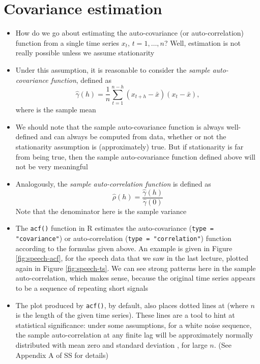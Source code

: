 \documentclass{article}
\begin{document}
\section{Covariance estimation}

\begin{itemize}
\item How do we go about estimating the auto-covariance (or auto-correlation)
  function from a single time series $x_t$, $t = 1,\dots,n$? Well, estimation is 
  not really possible unless we assume stationarity

\item Under this assumption, it is reasonable to consider the \emph{sample 
    auto-covariance function}, defined as 
  \[
  \hat\gamma(h) = \frac{1}{n} \sum_{t=1}^{n-h} (x_{t+h} - \bar{x})(x_t -
  \bar{x}),
  \]
  where  is the sample mean

\item We should note that the sample auto-covariance function is always
  well-defined and can always be computed from data, whether or not the
  stationarity assumption is (approximately) true. But if stationarity is far
  from being true, then the sample auto-covariance function defined above will
  not be very meaningful 

\item Analogously, the \emph{sample auto-correlation function} is defined as 
  \[
  \hat\rho(h) = \frac{\hat\gamma(h)}{\hat\gamma(0)}
  \]
  Note that the denominator here is the sample variance

\item The \verb|acf()| function in R estimates the auto-covariance
  (\verb|type = "covariance"|) or auto-correlation 
  (\verb|type = "correlation"|) function according to the formulas given
  above. An example is given in Figure \ref{fig:speech-acf}, for the speech data
  that we saw in the last lecture, plotted again in Figure
  \ref{fig:speech-ts}. We can see strong patterns here in the sample
  auto-correlation, which makes sense, because the original time series appears
  to be a sequence of repeating short signals   

\item The plot produced by \verb|acf()|, by default, also places dotted lines 
  at  (where $n$ is the length of the given time
  series). These lines are a tool to hint at statistical significance: under
  some assumptions, for a white noise sequence, the sample auto-correlation at
  any finite lag will be approximately normally distributed with mean zero and
  standard deviation , for large $n$. (See Appendix A of SS
  for details)  


\end{itemize}
\end{document}
